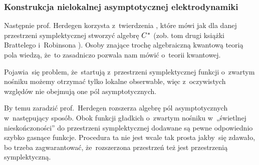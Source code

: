 \documentclass[10pt,t]{beamer}
\begin{document}





\begin{frame}
  \frametitle{Konstrukcja nielokalnej asymptotycznej
    elektrodynamiki}


  Następnie prof. Herdegen korzysta z~twierdzenia
  ,
  które mówi jak dla danej przestrzeni symplektycznej stworzyć algebrę
  $C^{ \hspace{0.05em} * }$ (zob. tom drugi książki Brattelego i~Robinsona
  \parencite{Bratteli-Robinson-Operator-algebras-ETC-Vol-I-Pub-2002}).
  Osoby znające trochę algebraiczną kwantową teorią pola wiedzą, że~to
  zasadniczo pozwala nam mówić o~teorii kwantowej.

  Pojawia~się problem, że~startują z~przestrzeni symplektycznej funkcji
  o~zwartym nośniku możemy otrzymać tylko \alert{lokalne} obserwable,
  więc z~oczywistych względów nie obejmują one pól asymptotycznych.

  By temu zaradzić prof.~Herdegen rozszerza algebrę pól asymptotycznych
  w~następujący sposób. Obok funkcji gładkich o~zwartym nośniku
  w~„świetlnej nieskończoności” do przestrzeni symplektycznej dodawane
  są pewne odpowiednio szybko gasnące funkcje. Procedura ta nie jest wcale
  tak prosta jakby~się zdawało, bo trzeba zagwarantować, że~rozszerzona
  przestrzeń też jest przestrzenią symplektyczną.

\end{frame}
\end{document}
